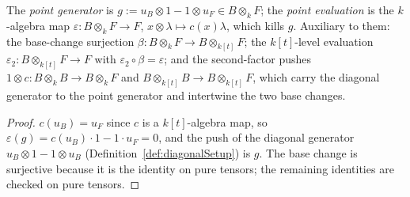 \begin{definition}
  \label{def:pointGen_pointEv}
  \leanok
  The \emph{point generator} is \(g := u_B \otimes 1 - 1 \otimes u_F \in B \otimes_k F\);
  the \emph{point evaluation} is the \(k\)-algebra map
  \(\varepsilon \colon B \otimes_k F \to F\), \(x \otimes \lambda \mapsto c(x)\lambda\),
  which kills \(g\). Auxiliary to them: the base-change surjection
  \(\beta \colon B \otimes_k F \to B \otimes_{k[t]} F\); the \(k[t]\)-level evaluation
  \(\varepsilon_2 \colon B \otimes_{k[t]} F \to F\) with
  \(\varepsilon_2 \circ \beta = \varepsilon\); and the second-factor pushes
  \(1 \otimes c \colon B \otimes_k B \to B \otimes_k F\) and
  \(B \otimes_{k[t]} B \to B \otimes_{k[t]} F\), which carry the diagonal generator to the
  point generator and intertwine the two base changes.
\end{definition}
\begin{proof}
  \leanok
  \(c(u_B) = u_F\) since \(c\) is a \(k[t]\)-algebra map, so
  \(\varepsilon(g) = c(u_B)\cdot 1 - 1 \cdot u_F = 0\), and the push of the diagonal
  generator \(u_B \otimes 1 - 1 \otimes u_B\) (Definition~\ref{def:diagonalSetup}) is \(g\).
  The base change is surjective because it is the identity on pure tensors; the remaining
  identities are checked on pure tensors.
\end{proof}

